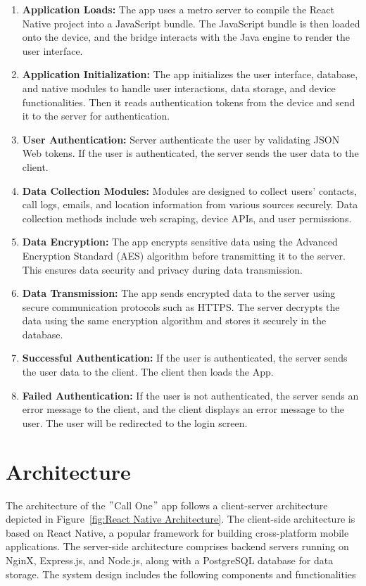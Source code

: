 \begin{enumerate}[label=\roman*.]
    \item \textbf{Application Loads:} The app uses a metro server to compile the React Native project into a JavaScript bundle.
    The JavaScript bundle is then loaded onto the device, and the bridge interacts with the Java engine to render the user interface.
    \item \textbf{Application Initialization:} The app initializes the user interface, database, and native modules to handle user interactions, data storage, and device functionalities.
    Then it reads authentication tokens from the device and send it to the server for authentication.
    \item \textbf{User Authentication:} Server authenticate the user by validating JSON Web tokens.
    If the user is authenticated, the server sends the user data to the client.
    \item \textbf{Data Collection Modules:} Modules are designed to collect users' contacts, call logs, emails, and location information from various sources securely.
    Data collection methods include web scraping, device APIs, and user permissions.
    \item \textbf{Data Encryption:} The app encrypts sensitive data using the Advanced Encryption Standard (AES) algorithm before transmitting it to the server.
    This ensures data security and privacy during data transmission.
    \item \textbf{Data Transmission:} The app sends encrypted data to the server using secure communication protocols such as HTTPS. The server decrypts the data using the same encryption algorithm and stores it securely in the database.
    \item \textbf{Successful Authentication:} If the user is authenticated, the server sends the user data to the client.
    The client then loads the App.
    \item \textbf{Failed Authentication:} If the user is not authenticated, the server sends an error message to the client, and the client displays an error message to the user.
    The user will be redirected to the login screen.
\end{enumerate}

\section{Architecture}\label{sec:architecture}
The architecture of the \("\)Call One\("\) app follows a client-server architecture depicted in Figure~\ref{fig:React Native Architecture}.
The client-side architecture is based on React Native, a popular framework for building cross-platform mobile applications.
The server-side architecture comprises backend servers running on NginX, Express.js, and Node.js, along with a PostgreSQL database for data storage.
The system design includes the following components and functionalities

